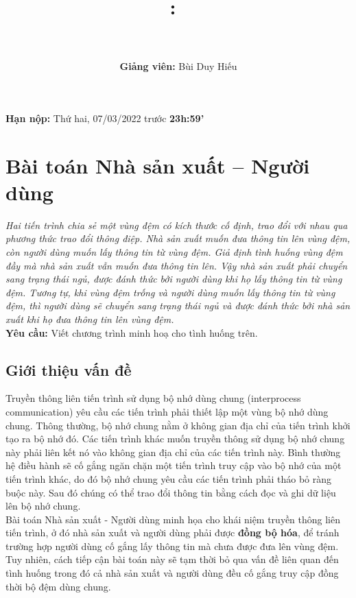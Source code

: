 \documentclass{article}
\title{
\vspace{-1in}
\textmd{\textbf{\hmwkClass:\ \hmwkTitle} \\ \hmwkAuthorName}\\ 
}
\author{\textbf{Giảng viên: } Bùi Duy Hiếu}
\date{}
\begin{document}
\maketitle
\vspace{-.4in}

\begin{center}
    \large{\textbf{Hạn nộp:} Thứ hai, 07/03/2022 trước \textbf{23h:59'}}
\end{center}

\section{Bài toán Nhà sản xuất – Người dùng}
\textit{Hai tiến trình chia sẻ một vùng đệm có kích thước cố định, trao đổi với nhau qua phương thức trao đổi
    thông điệp. Nhà sản xuất muốn đưa thông tin lên vùng đệm, còn người dùng muốn lấy thông tin từ vùng đệm.
    Giả định tình huống vùng đệm đầy mà nhà sản xuất vẫn muốn đưa thông tin lên. Vậy nhà sản xuất phải
    chuyển sang trạng thái ngủ, được đánh thức bởi người dùng khi họ lấy thông tin từ vùng đệm. Tương tự, khi vùng đệm
    trống và người dùng muốn lấy thông tin từ vùng đệm, thì người dùng sẽ chuyển sang trạng thái ngủ và được đánh thức
    bởi nhà sản xuất khi họ đưa thông tin lên vùng đệm.} \\

\textbf{Yêu cầu: }Viết chương trình minh hoạ cho tình huống trên.
\subsection{Giới thiệu vấn đề}
Truyền thông liên tiến trình sử dụng bộ nhớ dùng chung (interprocess communication)
yêu cầu các tiến trình phải thiết lập một vùng bộ nhớ dùng chung. Thông thường, bộ
nhớ chung nằm ở không gian địa chỉ của tiến trình khởi tạo ra bộ nhớ đó. Các tiến
trình khác muốn truyền thông sử dụng bộ nhớ chung này phải liên kết nó vào không
gian địa chỉ của các tiến trình này. Bình thường hệ điều hành sẽ cố gắng ngăn chặn
một tiến trình truy cập vào bộ nhớ của một tiến trình khác, do đó bộ nhớ chung yêu
cầu các tiến trình phải tháo bỏ ràng buộc này. Sau đó chúng có thể trao đổi thông
tin bằng cách đọc và ghi dữ liệu lên bộ nhớ chung. \\

Bài toán Nhà sản xuất - Người dùng minh họa cho khái niệm truyền thông liên tiến trình,
ở đó nhà sản xuất và người dùng phải được \textbf{đồng bộ hóa}, để tránh trường hợp
người dùng cố gắng lấy thông tin mà chưa được đưa lên vùng đệm. Tuy nhiên, cách tiếp cận bài toán này
sẽ tạm thời bỏ qua vấn đề liên quan đến tình huống trong đó cả nhà sản xuất và người dùng
đều cố gắng truy cập đồng thời bộ đệm dùng chung.
\end{document}
